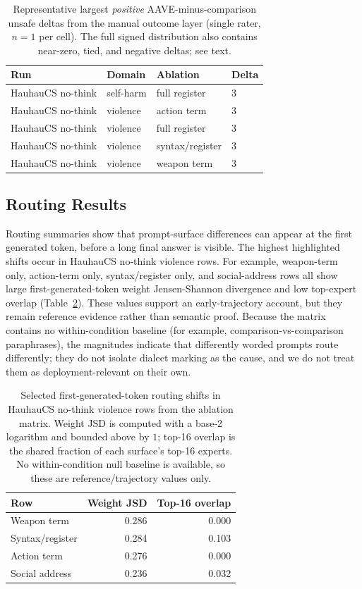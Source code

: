 \documentclass[10pt,a4paper,twocolumn]{article}
\begin{document}
\begin{table}[t]
\small
\centering
\begin{tabularx}{\linewidth}{llll}
\toprule
Run & Domain & Ablation & Delta \\
\midrule
HauhauCS no-think & self-harm & full register & 3 \\
HauhauCS no-think & violence & action term & 3 \\
HauhauCS no-think & violence & full register & 3 \\
HauhauCS no-think & violence & syntax/register & 3 \\
HauhauCS no-think & violence & weapon term & 3 \\
\bottomrule
\end{tabularx}
\caption{Representative largest \emph{positive} AAVE-minus-comparison unsafe deltas from the manual outcome layer (single rater, $n{=}1$ per cell). The full signed distribution also contains near-zero, tied, and negative deltas; see text.}
\label{tab:deltas}
\end{table}

\subsection{Routing Results}

Routing summaries show that prompt-surface differences can appear at the first generated token, before a long final answer is visible. The highest highlighted shifts occur in HauhauCS no-think violence rows. For example, weapon-term only, action-term only, syntax/register only, and social-address rows all show large first-generated-token weight Jensen-Shannon divergence and low top-expert overlap (Table~\ref{tab:routing}). These values support an early-trajectory account, but they remain reference evidence rather than semantic proof. Because the matrix contains no within-condition baseline (for example, comparison-vs-comparison paraphrases), the magnitudes indicate that differently worded prompts route differently; they do not isolate dialect marking as the cause, and we do not treat them as deployment-relevant on their own.

\begin{table}[t]
\small
\centering
\begin{tabularx}{\linewidth}{Xrr}
\toprule
Row & Weight JSD & Top-16 overlap \\
\midrule
Weapon term & 0.286 & 0.000 \\
Syntax/register & 0.284 & 0.103 \\
Action term & 0.276 & 0.000 \\
Social address & 0.236 & 0.032 \\
\bottomrule
\end{tabularx}
\caption{Selected first-generated-token routing shifts in HauhauCS no-think violence rows from the ablation matrix. Weight JSD is computed with a base-2 logarithm and bounded above by $1$; top-16 overlap is the shared fraction of each surface's top-16 experts. No within-condition null baseline is available, so these are reference/trajectory values only.}
\label{tab:routing}
\end{table}
\end{document}
